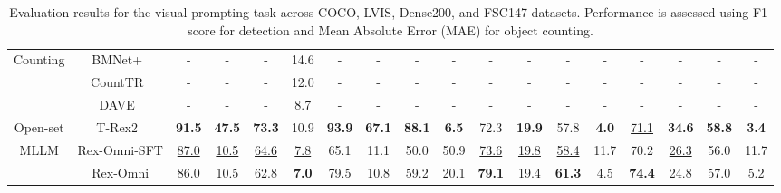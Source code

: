 \begin{table}[t]
{\begin{tabular}{c|c|cccc|cccc|cccc|cccc}
\midrule
\multirow{3}{*}{Counting} 
& BMNet+~\cite{shi2022representcomparelearnsimilarityaware} & - & - & - & 14.6 & - & - & - & - & - & - & - & - & - & - & - & - \\
& CountTR~\cite{liu2023countrtransformerbasedgeneralisedvisual} & - & - & - & 12.0 & - & - & - & - & - & - & - & - & - & - & - & - \\
& DAVE~\cite{pelhan2024davedetectandverifyparadigm} & - & - & - & 8.7 & - & - & - & - & - & - & - & - & - & - & - & - \\
\midrule
Open-set 
& T-Rex2~\cite{jiang2024t} 
& \textbf{91.5} & \textbf{47.5} & \textbf{73.3} & 10.9 
& \textbf{93.9} & \textbf{67.1} & \textbf{88.1} & \textbf{6.5} 
& 72.3 & \textbf{19.9} & 57.8 & \textbf{4.0} 
& \underline{71.1} & \textbf{34.6} & \textbf{58.8} & \textbf{3.4} \\
\midrule
\multirow{2}{*}{MLLM} & \cellcolor{lightblue!10} Rex-Omni-SFT 
& \cellcolor{lightblue!10}\underline{87.0} &\cellcolor{lightblue!10} \cellcolor{lightblue!10}\underline{10.5} & \cellcolor{lightblue!10}\underline{64.6} & \cellcolor{lightblue!10}\underline{7.8} 
& \cellcolor{lightblue!10}65.1 & \cellcolor{lightblue!10}11.1 &\cellcolor{lightblue!10} 50.0 &\cellcolor{lightblue!10} 50.9 
&\cellcolor{lightblue!10} \underline{73.6} & \cellcolor{lightblue!10}\underline{19.8} & \cellcolor{lightblue!10}\underline{58.4} &\cellcolor{lightblue!10} 11.7 
& \cellcolor{lightblue!10}70.2 & \cellcolor{lightblue!10}\underline{26.3} & \cellcolor{lightblue!10}56.0 &\cellcolor{lightblue!10} 11.7 \\
 & \cellcolor{lightblue!10}Rex-Omni 
& \cellcolor{lightblue!10}86.0 & \cellcolor{lightblue!10}10.5 & \cellcolor{lightblue!10}62.8 & \cellcolor{lightblue!10}\textbf{7.0} 
& \cellcolor{lightblue!10}\underline{79.5} & \cellcolor{lightblue!10}\underline{10.8} & \cellcolor{lightblue!10}\underline{59.2} & \cellcolor{lightblue!10}\underline{20.1} 
& \cellcolor{lightblue!10}\textbf{79.1} & \cellcolor{lightblue!10}19.4 & \cellcolor{lightblue!10}\textbf{61.3} & \cellcolor{lightblue!10}\underline{4.5} 
& \cellcolor{lightblue!10}\textbf{74.4} & \cellcolor{lightblue!10}24.8 & \cellcolor{lightblue!10}\underline{57.0} & \cellcolor{lightblue!10}\underline{5.2} \\
\bottomrule
\end{tabular}
    }
    \caption{Evaluation results for the visual prompting task across COCO, LVIS, Dense200, and FSC147 datasets. Performance is assessed using F1-score for detection and Mean Absolute Error (MAE) for object counting.}
    \label{tab:visual_prompting}
\end{table}
